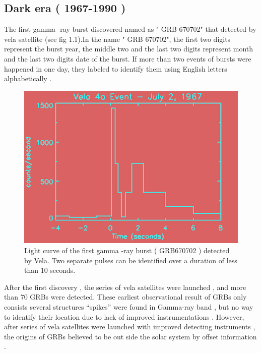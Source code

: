 \subsection{Dark era ( 1967-1990 )}
 The first gamma -ray burst discovered  named as " GRB 670702" that  detected by vela satellite (see fig 1.1).In the name " GRB 670702", the first two digits represent the burst year, the middle two  and the last two digits represent month and the last two digits date of the burst. If more than two events of bursts were happened in one day, they labeled to identify them  using  English letters alphabetically .\citep{5}
\begin{center}
\begin{figure}[h]
\includegraphics[scale=0.2]{Figures/fig1.png}
\caption{Light curve of the first gamma -ray burst (  GRB670702  ) detected by Vela. Two separate pulses can be identified over a duration of less than 10 seconds. \citep{ 4 }}
\end{figure}
\end{center}
After the first discovery , the series of vela satellites were launched , and more than 70 GRBs were detected. These earliest observational result of GRBs only consists several structures  “spikes”  were found in Gamma-ray band , but  no  way to identify their  location due to  lack  of improved  instrumentations . However, after series of  vela satellites were  launched  with  improved  detecting  instruments , the origins of GRBs  believed  to be out side the  solar system by offset information \citep{ 4 , 5}.\\\\
